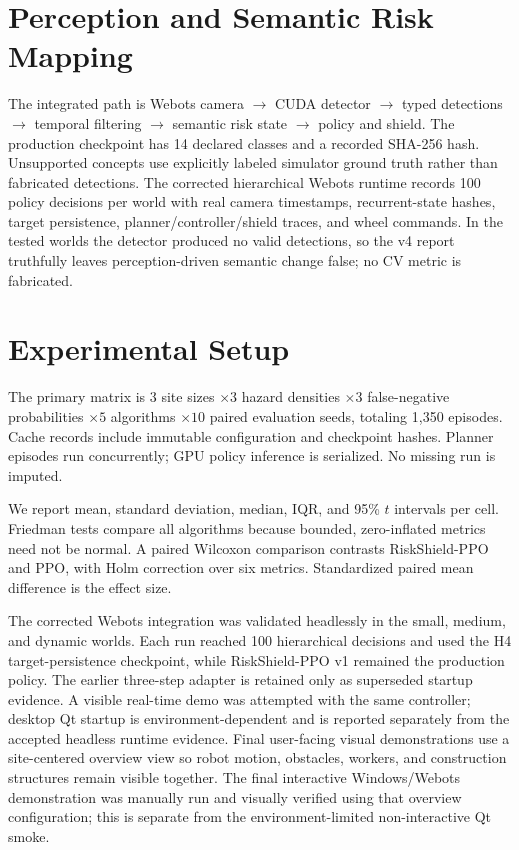 \documentclass[conference]{IEEEtran}
\begin{document}
\section{Perception and Semantic Risk Mapping}
The integrated path is Webots camera $\rightarrow$ CUDA detector $\rightarrow$
typed detections $\rightarrow$ temporal filtering $\rightarrow$ semantic risk
state $\rightarrow$ policy and shield. The production checkpoint has 14
declared classes and a recorded SHA-256 hash. Unsupported concepts use
explicitly labeled simulator ground truth rather than fabricated detections.
The corrected hierarchical Webots runtime records 100 policy decisions per
world with real camera timestamps, recurrent-state hashes, target persistence,
planner/controller/shield traces, and wheel commands. In the tested worlds the
detector produced no valid detections, so the v4 report truthfully leaves
perception-driven semantic change false; no CV metric is fabricated.

\section{Experimental Setup}
The primary matrix is $3$ site sizes $\times3$ hazard densities $\times3$
false-negative probabilities $\times5$ algorithms $\times10$ paired evaluation
seeds, totaling 1,350 episodes. Cache records include immutable configuration
and checkpoint hashes. Planner episodes run concurrently; GPU policy inference
is serialized. No missing run is imputed.

We report mean, standard deviation, median, IQR, and 95\% $t$ intervals per
cell. Friedman tests compare all algorithms because bounded, zero-inflated
metrics need not be normal. A paired Wilcoxon comparison contrasts
RiskShield-PPO and PPO, with Holm correction over six metrics. Standardized
paired mean difference is the effect size.

The corrected Webots integration was validated headlessly in the small,
medium, and dynamic worlds. Each run reached 100 hierarchical decisions and
used the H4 target-persistence checkpoint, while RiskShield-PPO v1 remained
the production policy. The earlier three-step adapter is retained only as
superseded startup evidence. A visible real-time demo was attempted with the
same controller; desktop Qt startup is environment-dependent and is reported
separately from the accepted headless runtime evidence. Final user-facing
visual demonstrations use a site-centered overview view so robot motion,
obstacles, workers, and construction structures remain visible together. The
final interactive Windows/Webots demonstration was manually run and visually
verified using that overview configuration; this is separate from the
environment-limited non-interactive Qt smoke.
\end{document}

